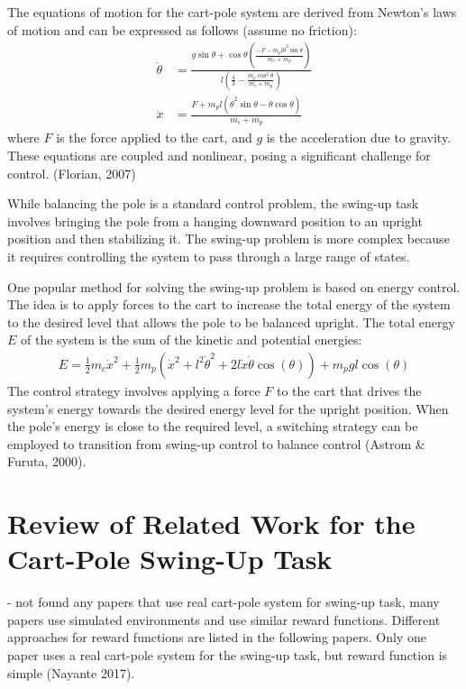 The equations of motion for the cart-pole system are derived from Newton's laws of motion and can be expressed as follows (assume no friction):
\begin{align}
    \ddot{\theta} &= \frac{g\sin\theta + \cos\theta\left(\frac{-F-m_pl\dot{\theta}^2\sin\theta}{m_c+m_p}\right)}{l\left(\frac{4}{3}-\frac{m_p\cos^2\theta}{m_c+m_p}\right)} \\
    \ddot{x} &= \frac{F+m_pl(\dot{\theta}^2\sin\theta-\ddot{\theta}\cos\theta)}{m_c+m_p}
\end{align}
where $F$ is the force applied to the cart, and $g$ is the acceleration due to gravity. These equations are coupled and nonlinear, posing a significant challenge for control. (Florian, 2007)

While balancing the pole is a standard control problem, the swing-up task involves bringing the pole from a hanging downward position to an upright position and then stabilizing it. The swing-up problem is more complex because it requires controlling the system to pass through a large range of states.

One popular method for solving the swing-up problem is based on energy control. The idea is to apply forces to the cart to increase the total energy of the system to the desired level that allows the pole to be balanced upright. The total energy $E$ of the system is the sum of the kinetic and potential energies:
\begin{align}
    E = \frac{1}{2}m_c\dot{x}^2 + \frac{1}{2}m_p(\dot{x}^2 + l^2\dot{\theta}^2 + 2l\dot{x}\dot{\theta}\cos(\theta)) + m_pgl\cos(\theta)
\end{align}
The control strategy involves applying a force $F$ to the cart that drives the system's energy towards the desired energy level for the upright position. When the pole's energy is close to the required level, a switching strategy can be employed to transition from swing-up control to balance control (Astrom & Furuta, 2000).

\section{Review of Related Work for the Cart-Pole Swing-Up Task} %
- not found any papers that use real cart-pole system for swing-up task, many papers use simulated environments and use similar reward functions. Different approaches for reward functions are listed in the following papers. Only one paper uses a real cart-pole system for the swing-up task, but reward function is simple (Nayante 2017). 

